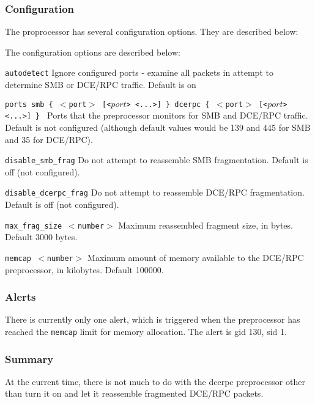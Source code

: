 \documentclass[english]{report}
\newcounter{slistnum}
\newenvironment{slist}
{ \begin{list}{ {\bf \arabic{slistnum}.} }{\usecounter{slistnum} } }
{ \end{list} }
\begin{document}
\subsubsection{Configuration}

The proprocessor has several configuration options.  They are described
below:

The configuration options are described below:

\begin{slist}

\item \texttt{autodetect}
Ignore configured ports - examine all packets in attempt to determine
SMB or DCE/RPC traffic.  Default is on

\item \texttt{ports smb \{ $<$port$>$ [<$port$> <...>] \} dcerpc \{ $<$port$>$ [<$port$> <...>] \} }
Ports that the preprocessor monitors for SMB and DCE/RPC traffic.
Default is not configured (although default values would be 139
and 445 for SMB and 35 for DCE/RPC).

\item \texttt{disable\_smb\_frag}
Do not attempt to reassemble SMB fragmentation.   Default is off
(not configured).

\item \texttt{disable\_dcerpc\_frag}
Do not attempt to reassemble DCE/RPC fragmentation.   Default is off
(not configured).

\item \texttt{max\_frag\_size $<$number$>$}
Maximum reassembled fragment size, in bytes.  Default 3000 bytes.

\item \texttt{memcap $<$number$>$}
Maximum amount of memory available to the DCE/RPC preprocessor, in
kilobytes.  Default 100000.

\end{slist}

\subsubsection{Alerts}
There is currently only one alert, which is triggered when the preprocessor
has reached the \texttt{memcap} limit for memory allocation.  The
alert is gid 130, sid 1.

\subsubsection{Summary}
At the current time, there is not much to do with the dcerpc preprocessor
other than turn it on and let it reassemble fragmented DCE/RPC packets.
\end{document}

